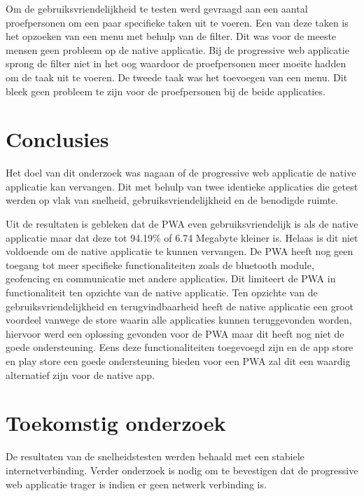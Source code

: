 \documentclass[a0,portrait]{a0poster}
\begin{document}
\begin{multicols}{2}

Om de gebruiksvriendelijkheid te testen werd gevraagd aan een aantal proefpersonen om een paar specifieke taken uit te voeren. Een van deze taken is het opzoeken van een menu met behulp van de filter. Dit was voor de meeste mensen geen probleem op de native applicatie. Bij de progressive web applicatie sprong de filter niet in het oog waardoor de proefpersonen meer moeite hadden om de taak uit te voeren. De tweede taak was het toevoegen van een menu. Dit bleek geen probleem te zijn voor de proefpersonen bij de beide applicaties. 




\color{HoGentAccent1} 
\section*{Conclusies}
\color{black}
Het doel van dit onderzoek was nagaan of de progressive web applicatie de native applicatie kan vervangen. Dit met behulp van twee identieke applicaties die getest werden op vlak van snelheid, gebruiksvriendelijkheid en de benodigde ruimte.

Uit de resultaten is gebleken dat de PWA even gebruiksvriendelijk is als de native applicatie maar dat deze tot 94.19\% of 6.74 Megabyte kleiner is. Helaas is dit niet voldoende om de native applicatie te kunnen vervangen. De PWA heeft nog geen toegang tot meer specifieke functionaliteiten zoals de bluetooth module, geofencing en communicatie met andere applicaties. Dit limiteert de PWA in functionaliteit ten opzichte van de native applicatie. Ten opzichte van de gebruiksvriendelijkheid en terugvindbaarheid heeft de native applicatie een groot voordeel vanwege de store waarin alle applicaties kunnen teruggevonden worden, hiervoor werd een oplossing gevonden voor de PWA maar dit heeft nog niet de goede ondersteuning.
Eens deze functionaliteiten toegevoegd zijn en de app store en play store een goede ondersteuning bieden voor een PWA zal dit een waardig alternatief zijn voor de native app.

\color{HoGentAccent1} 
\section*{Toekomstig onderzoek}
\color{black}
De resultaten van de snelheidstesten werden behaald met een stabiele internetverbinding. Verder onderzoek is nodig om te bevestigen dat de progressive web applicatie trager is indien er geen netwerk verbinding is.

\end{multicols}
\end{document}
